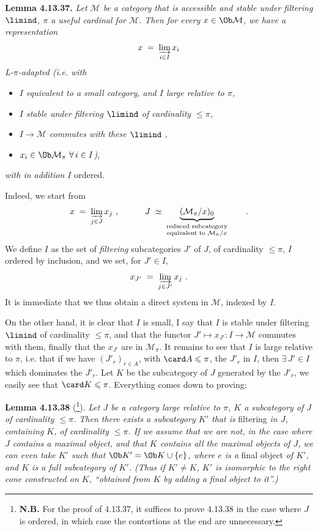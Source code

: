 \textbf{Lemma 4.13.37.} \textit{Let $\mathcal{M}$ be a category}
\textit{that is accessible and stable under filtering $\limind$, $\pi$ a useful cardinal for $\mathcal{M}$. Then for every $x \in \Ob \mathcal{M}$, we have a representation}
\[ x \;=\; \varinjlim_{i\in I} x_i \]
\textit{L-$\pi$-adapted (i.e. with}
\begin{itemize}[leftmargin=2.5em]
\item[\textit{1)}] \textit{$I$ equivalent to a small category, and $I$ large relative to $\pi$,}
\item[\textit{2)}] \textit{$I$ stable under filtering $\limind$ of cardinality $\leqslant \pi$,}
\item[\textit{3)}] \textit{$I \longrightarrow \mathcal{M}$ commutes with these $\limind$ ,}
\item[\textit{d)}] \textit{$x_i \in \Ob \mathcal{M}_\pi \ \forall\, i \in I$),} %
\end{itemize}
\textit{with in addition $I$} ordered.

Indeed, we start from
\[ x \;=\; \varinjlim_{j\in J} x_j \ , \qquad\quad J \;\simeq\; \underbrace{(\mathcal{M}_\pi/x)_0}_{\substack{\text{reduced subcategory}\\ \text{equivalent to } \mathcal{M}_\pi/x}} \qquad . \]
We define $I$ as the set of \textit{filtering} subcategories $J'$ of $J$, of cardinality $\leqslant \pi$, $I$ ordered by inclusion, and we set, for $J' \in I$,
\[ x_{J'} \;=\; \varinjlim_{j\in J'} x_j \ . \]
It is immediate that we thus obtain a direct system in $\mathcal{M}$, indexed by $I$.


On the other hand, it is clear that $I$ is small, I say that $I$ is stable under filtering $\limind$ of cardinality $\leqslant \pi$, and that the functor $J' \longmapsto x_{J'} : I \longrightarrow \mathcal{M}$ commutes with them, finally that the $x_{J'}$ are in $\mathcal{M}_\pi$. It remains to see that $I$ is large relative to $\pi$, i.e. that if we have $(J'_r)_{r\in A}$, with $\card A \leqslant \pi$, the $J'_r$ in $I$, then $\exists\, J' \in I$ which dominates the $J'_r$. Let $K$ be the subcategory of $J$ generated by the $J'_r$, we easily see that $\card K \leqslant \pi$. Everything comes down to proving:

\textbf{Lemma 4.13.38} (\footnote[160]{\textbf{N.B.} For the proof of 4.13.37, it suffices to prove 4.13.38 in the case where $J$ is ordered, in which case the contortions at the end are unnecessary.}). \textit{Let $J$ be a category large relative to $\pi$, $K$ a subcategory of $J$ of cardinality $\leqslant \pi$. Then there exists a subcategory $K'$ that is} filtering \textit{in $J$, containing $K$, of cardinality $\leqslant \pi$. If we assume that we are not, in the case where $J$ contains a maximal object, and that $K$ contains all the maximal objects of $J$,}
\textit{we can even take $K'$ such that $\Ob K' = \Ob K \cup \{e\}$, where $e$ is a} final object \textit{of $K'$, and $K$ is a full subcategory of $K'$. (Thus if $K' \neq K$, $K'$ is isomorphic to the right cone constructed on $K$, ``obtained from $K$ by adding a final object to it''.)}


